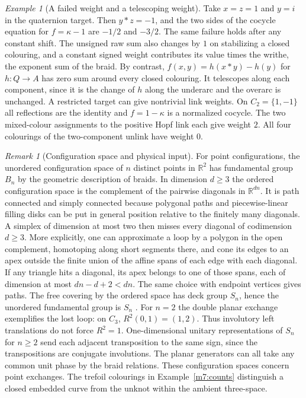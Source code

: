 \documentclass[11pt,reqno]{amsart}
\theoremstyle{definition}
\theoremstyle{remark}
\newtheorem{remark}[theorem]{Remark}
\newtheorem{example}[theorem]{Example}
\numberwithin{equation}{section}
\newcommand{\R}{\mathbb{R}}
\begin{document}
\begin{example}[A failed weight and a telescoping weight]\label{m7:cocycle-ex}
Take $x=z=1$ and $y=i$ in the quaternion target. Then $y*z=-1$,
and the two sides of the cocycle equation for $f=\kappa-1$ are
$-1/2$ and $-3/2$. The same failure holds after any constant shift.
The unsigned raw sum also changes by $1$ on stabilizing a closed
colouring, and a constant signed weight contributes its value times
the writhe, the exponent sum of the braid. By contrast,
$f(x,y)=h(x*y)-h(y)$ for $h:Q\to A$ has zero sum around every closed
colouring. It telescopes along each component, since it is the
change of $h$ along the underarc and the overarc is unchanged.
A restricted target can give nontrivial link weights. On
$C_2=\{1,-1\}$ all reflections are the identity and $f=1-\kappa$
is a normalized cocycle. The two mixed-colour assignments to
the positive Hopf link each give weight $2$. All four colourings
of the two-component unlink have weight $0$.
\end{example}

\begin{remark}[Configuration space and physical input]\label{m7:topology}
For point configurations, the unordered configuration space of $n$
distinct points in $\R^2$ has fundamental group $B_n$ by the geometric
description of braids. In dimension $d\ge3$ the ordered configuration
space is the complement of the pairwise diagonals in $\R^{dn}$. It is
path connected and simply connected because polygonal paths and
piecewise-linear filling disks can be put in general position relative
to the finitely many diagonals. A simplex of dimension at most two
then misses every diagonal of codimension $d\ge3$. More explicitly,
one can approximate a loop by a polygon in the open complement,
homotoping along short segments there, and cone its edges to an
apex outside the finite union of the affine spans of each edge with
each diagonal. If any triangle hits a diagonal, its apex belongs
to one of those spans, each of dimension at most $dn-d+2<dn$.
The same choice with endpoint vertices gives paths. The free covering
by the ordered space has deck group $S_n$, hence the unordered
fundamental group is $S_n$ \cite{m7:Fadell,m7:Birman}.
For $n=2$ the double planar exchange exemplifies the lost loop:
on $C_3$, $R^2(0,1)=(1,2)$. Thus involutory left translations do not
force $R^2=1$. One-dimensional unitary representations of $S_n$ for
$n\ge2$ send each adjacent transposition to the same sign, since the
transpositions are conjugate involutions. The planar generators can
all take any common unit phase by the braid relations.
These configuration spaces concern point exchanges. The trefoil
colourings in Example~\ref{m7:counts} distinguish a closed embedded
curve from the unknot within the ambient three-space.
\end{remark}
\end{document}
